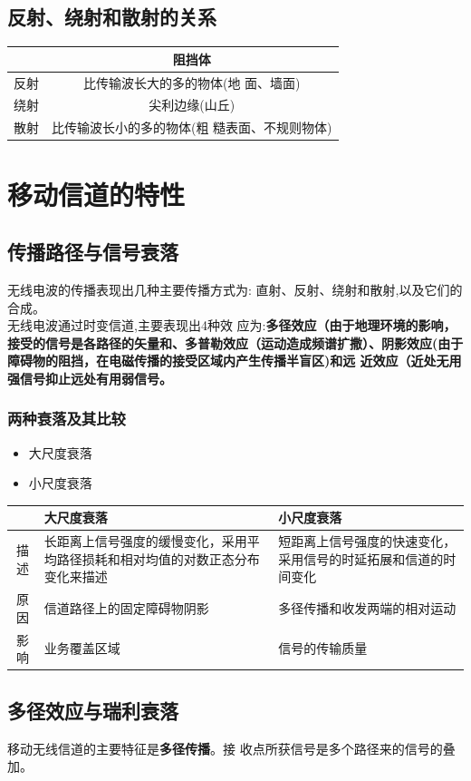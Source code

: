\subsection{反射、绕射和散射的关系}
\begin{tabular}{|c|c|}
	\hline
		&阻挡体	\\
		\hline
		反射	&	比传输波长大的多的物体(地
		面、墙面)	\\
				\hline
		绕射	&	尖利边缘(山丘)\\
				\hline
		散射	&	比传输波长小的多的物体(粗
		糙表面、不规则物体)	\\
				\hline
\end{tabular}

\section{移动信道的特性
}
\subsection{传播路径与信号衰落
}
无线电波的传播表现出几种主要传播方式为:
直射、反射、绕射和散射,以及它们的合成。\\
无线电波通过时变信道,主要表现出4种效
应为:\textbf{多径效应（由于地理环境的影响，接受的信号是各路径的矢量和、多普勒效应（运动造成频谱扩撒）、阴影效应(由于障碍物的阻挡，在电磁传播的接受区域内产生传播半盲区)和远
近效应（近处无用强信号抑止远处有用弱信号。}
\subsubsection{两种衰落及其比较}
\begin{itemize}
	\item 大尺度衰落
	\item 小尺度衰落
\end{itemize}
\begin{tabular}{|c|m{6cm}|m{6cm}|}
	\hline
		&大尺度衰落	&小尺度衰落		\\
	\hline
	描述
	& 长距离上信号强度的缓慢变化，采用平均路径损耗和相对均值的对数正态分布变化来描述	&	短距离上信号强度的快速变化，采用信号的时延拓展和信道的时间变化	\\
	\hline
	原因	&	信道路径上的固定障碍物阴影	&	多径传播和收发两端的相对运动\\
	\hline
	影响	& 业务覆盖区域	&	信号的传输质量	\\
	\hline
\end{tabular}
\subsection{多径效应与瑞利衰落
}
移动无线信道的主要特征是\textbf{多径传播}。接
收点所获信号是多个路径来的信号的叠加。\\

